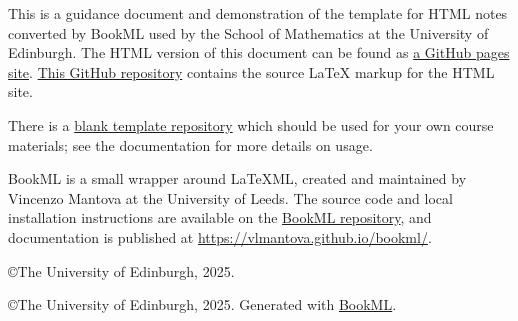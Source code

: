 \documentclass[12pt,oneside]{book}
\begin{document}


\maketitle

This is a guidance document and demonstration of the template for HTML notes converted by BookML used by the School of Mathematics at the University of Edinburgh. The HTML version of this document can be found as \href{https://uoe-school-of-mathematics.github.io/Workflow-Documentation/index.html}{a GitHub pages site}. \href{https://github.com/UoE-School-of-Mathematics/Workflow-Documentation}{This GitHub repository} contains the source LaTeX markup for the HTML site.

There is a \href{https://github.com/UoE-School-of-Mathematics/Workflow-Template-Blank}{blank template repository} which should be used for your own course materials; see the documentation for more details on usage.

BookML is a small wrapper around LaTeXML, created and maintained by Vincenzo Mantova at the University of Leeds. The source code and local installation instructions are available on the \href{https://github.com/vlmantova/bookml}{BookML repository}, and documentation is published at \url{https://vlmantova.github.io/bookml/}.


\tableofcontents




\iflatexml
    \copyright The University of Edinburgh, 2025.
\fi



\iflatexml
    \copyright The University of Edinburgh, 2025. Generated with \href{https://vlmantova.github.io/bookml/}{BookML}.
\fi


% 
\end{document}
